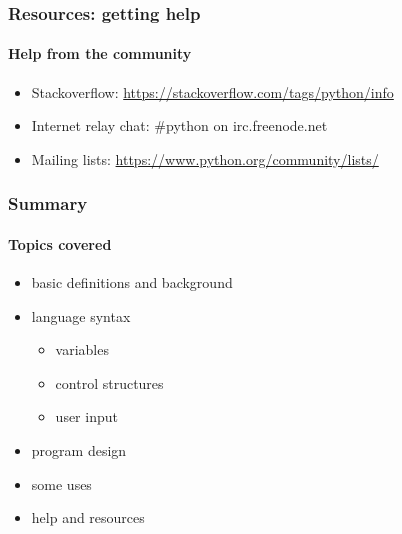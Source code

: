 \documentclass{beamer}
\begin{document}
    \begin{frame}
	    \frametitle{Resources: getting help}
	    \framesubtitle{Help from the community}
	    \begin{itemize}
		    \item Stackoverflow: \url{https://stackoverflow.com/tags/python/info}
		    \item Internet relay chat: \#python on irc.freenode.net
		    \item Mailing lists: \url{https://www.python.org/community/lists/}
	    \end{itemize}
    \end{frame}
   \begin{frame}
	   \frametitle{Summary}
	    \framesubtitle{Topics covered}
	    \begin{itemize}
		    \item basic definitions and background
		    \item language syntax
			    \begin{itemize}
				    \item variables
				    \item control structures
				    \item user input
			    \end{itemize}
		    \item program design
		    \item some uses
		    \item help and resources
	    \end{itemize}
   \end{frame}
\end{document}
